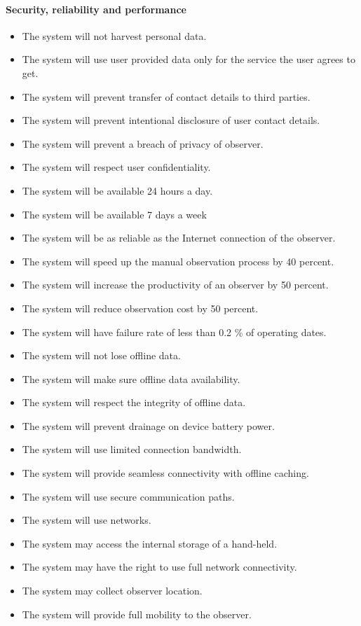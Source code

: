     \paragraph{Security, reliability and performance}
	\begin{itemize}
		\item The system will not harvest personal data.
        \item The system will use user provided data only for the service the user agrees to get.
        \item The system will prevent transfer of contact details to third parties.
        \item The system will prevent intentional disclosure of user contact details.
        \item The system will prevent a breach of privacy of observer.
        \item The system will respect user confidentiality.
        \item The system will be available 24 hours a day.
        \item The system will be available 7 days a week
        \item The system will be as reliable as the Internet connection of the observer.
        \item The system will speed up the manual observation process by 40 percent.
        \item The system will increase the productivity of an observer by 50 percent.
        \item The system will reduce observation cost by 50 percent.
        \item The system will have failure rate of less than 0.2 \% of operating dates.
        \item The system will not lose offline data.
        \item The system will make sure offline data availability.
        \item The system will respect the integrity of offline data.
        \item The system will prevent drainage on device battery power.
        \item The system will use limited connection bandwidth.
        \item The system will provide seamless connectivity with offline caching.
        \item The system will use secure communication paths.
        \item The system will use networks.
        \item The system may access the internal storage of a hand-held.
        \item The system may have the right to use full network connectivity.
        \item The system may collect observer location.
        \item The system will provide full mobility to the observer.

	\end{itemize}
